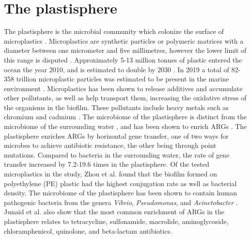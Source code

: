 \section{The plastisphere}
The plastisphere is the microbial community which colonize the surface of microplastics \cite{amaralzettler2020EcologyPlastisphere}. 
Microplastics are synthetic particles or polymeric matrices with a diameter between one micrometer and five millimetres, however the lower limit of this range is disputed \cite{frias2019MicroplasticsFindingConsensus}.
Approximately 5-13 million tonnes of plastic entered the ocean the year 2010, and is estimated to double by 2030 \cite{amaralzettler2020EcologyPlastisphere}. In 2019 a total of 82-358 trillion microplastic particles was estimated to be present in the marine environment \cite{eriksen2023GrowingPlasticSmog}.
Microplastics has been shown to release additives and accumulate other pollutants, as well as help transport them, increasing the oxidative stress of the organisms in the biofilm. These pollutants include heavy metals such as chromium and cadmium \cite{forero-lopez2022PlastisphereMicroplasticsSitu}.
The microbiome of the plastisphere is distinct from the microbiome of the surrounding water \cite{zadjelovic2023MicrobialHitchhikersHarbouring}, and has been shown to enrich ARGs \cite{zhou2024MicroplasticBiofilmsPromote}.
The plastisphere enriches ARGs by horizontal gene transfer, one of two ways for microbes to achieve antibiotic resistance, the other being through point mutations.
Compared to bacteria in the surrounding water, the rate of gene transfer increased by 7.2-19.6 times \cite{zhou2024MicroplasticBiofilmsPromote} in the plastisphere. Of the tested microplastics in the study, Zhou et al. found that the biofilm formed on polyethylene (PE) plastic had the highest conjugation rate as well as bacterial density. 
The microbiome of the plastisphere has been shown to contain human pathogenic bacteria from the genera \emph{Vibrio}, \emph{Pseudomonas}, and \emph{Acinetobacter} \cite{junaid2022SelectiveEnrichmentAntibiotic}. Junaid et al. also show that the most common enrichment of ARGs in the plastisphere relates to tetracycline, sulfonamide, macrolide, aminoglycoside, chloramphenicol, quinolone, and beta-lactam antibiotics.

